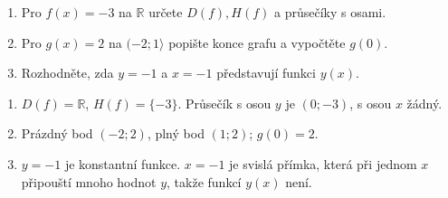 \documentclass[11pt,a4paper]{article}
\begin{document}
\begin{zadaniReseniBox}
\begin{enumerate}[label=\alph*)]
\item Pro $f(x)=-3$ na $\mathbb R$ určete $D(f),H(f)$ a průsečíky s osami.
\item Pro $g(x)=2$ na $(-2;1\rangle$ popište konce grafu a vypočtěte $g(0)$.
\item Rozhodněte, zda $y=-1$ a $x=-1$ představují funkci $y(x)$.
\end{enumerate}
\tcblower
\begin{enumerate}[label=\alph*)]
\item $D(f)=\mathbb R$, $H(f)=\{-3\}$. Průsečík s osou $y$ je $(0;-3)$, s osou $x$ žádný.
\item Prázdný bod $(-2;2)$, plný bod $(1;2)$; $g(0)=2$.
\item $y=-1$ je konstantní funkce. $x=-1$ je svislá přímka, která při jednom $x$ připouští mnoho hodnot $y$, takže funkcí $y(x)$ není.
\end{enumerate}
\end{zadaniReseniBox}
\end{document}
